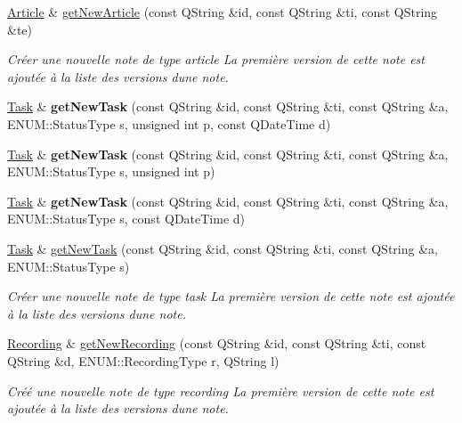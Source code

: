 \begin{DoxyCompactItemize}
\item 
\hyperlink{class_article}{Article} \& \hyperlink{class_notes_manager_a44bfd4e7fe88b7f300a4be5589f92923}{get\+New\+Article} (const Q\+String \&id, const Q\+String \&ti, const Q\+String \&te)
\begin{DoxyCompactList}\small\item\em Créer une nouvelle note de type article La première version de cette note est ajoutée à la liste des versions d\textquotesingle{}une note. \end{DoxyCompactList}\item 
\mbox{\label{class_notes_manager_a33c72b86b61bd62c4816ae1eca30da58}} 
\hyperlink{class_task}{Task} \& {\bfseries get\+New\+Task} (const Q\+String \&id, const Q\+String \&ti, const Q\+String \&a, E\+N\+U\+M\+::\+Status\+Type s, unsigned int p, const Q\+Date\+Time d)
\item 
\mbox{\label{class_notes_manager_ab312c383347a12123deec4769949e6b7}} 
\hyperlink{class_task}{Task} \& {\bfseries get\+New\+Task} (const Q\+String \&id, const Q\+String \&ti, const Q\+String \&a, E\+N\+U\+M\+::\+Status\+Type s, unsigned int p)
\item 
\mbox{\label{class_notes_manager_ad6f9ba1dfaf507ca78669997f90fc615}} 
\hyperlink{class_task}{Task} \& {\bfseries get\+New\+Task} (const Q\+String \&id, const Q\+String \&ti, const Q\+String \&a, E\+N\+U\+M\+::\+Status\+Type s, const Q\+Date\+Time d)
\item 
\hyperlink{class_task}{Task} \& \hyperlink{class_notes_manager_a39562bf5aef0d7a113317c1421d578fd}{get\+New\+Task} (const Q\+String \&id, const Q\+String \&ti, const Q\+String \&a, E\+N\+U\+M\+::\+Status\+Type s)
\begin{DoxyCompactList}\small\item\em Créer une nouvelle note de type task La première version de cette note est ajoutée à la liste des versions d\textquotesingle{}une note. \end{DoxyCompactList}\item 
\hyperlink{class_recording}{Recording} \& \hyperlink{class_notes_manager_a71d0bc2e2716a4e558705ea76e3ad491}{get\+New\+Recording} (const Q\+String \&id, const Q\+String \&ti, const Q\+String \&d, E\+N\+U\+M\+::\+Recording\+Type r, Q\+String l)
\begin{DoxyCompactList}\small\item\em Créé une nouvelle note de type recording La première version de cette note est ajoutée à la liste des versions d\textquotesingle{}une note. \end{DoxyCompactList}\item 

\end{DoxyCompactItemize}
